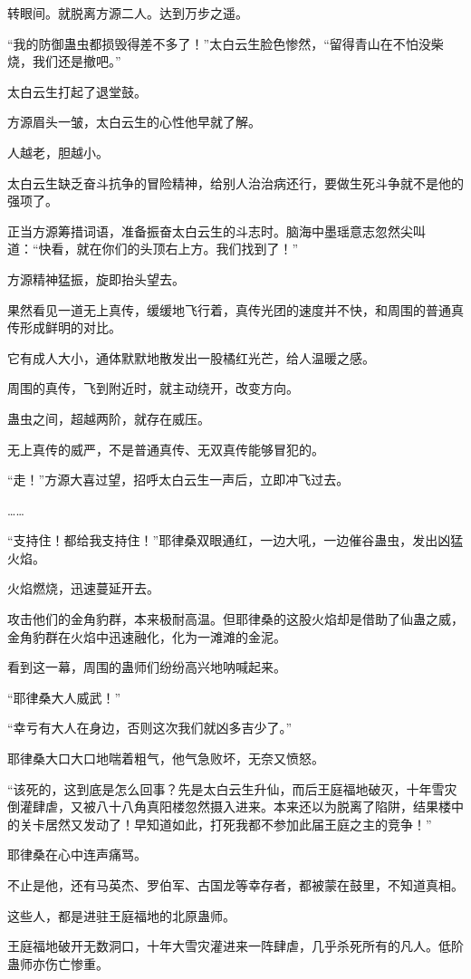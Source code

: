 \begin{this_body}
转眼间。就脱离方源二人。达到万步之遥。

“我的防御蛊虫都损毁得差不多了！”太白云生脸色惨然，“留得青山在不怕没柴烧，我们还是撤吧。”

太白云生打起了退堂鼓。

方源眉头一皱，太白云生的心性他早就了解。

人越老，胆越小。

太白云生缺乏奋斗抗争的冒险精神，给别人治治病还行，要做生死斗争就不是他的强项了。

正当方源筹措词语，准备振奋太白云生的斗志时。脑海中墨瑶意志忽然尖叫道：“快看，就在你们的头顶右上方。我们找到了！”

方源精神猛振，旋即抬头望去。

果然看见一道无上真传，缓缓地飞行着，真传光团的速度并不快，和周围的普通真传形成鲜明的对比。

它有成人大小，通体默默地散发出一股橘红光芒，给人温暖之感。

周围的真传，飞到附近时，就主动绕开，改变方向。

蛊虫之间，超越两阶，就存在威压。

无上真传的威严，不是普通真传、无双真传能够冒犯的。

“走！”方源大喜过望，招呼太白云生一声后，立即冲飞过去。

……

“支持住！都给我支持住！”耶律桑双眼通红，一边大吼，一边催谷蛊虫，发出凶猛火焰。

火焰燃烧，迅速蔓延开去。

攻击他们的金角豹群，本来极耐高温。但耶律桑的这股火焰却是借助了仙蛊之威，金角豹群在火焰中迅速融化，化为一滩滩的金泥。

看到这一幕，周围的蛊师们纷纷高兴地呐喊起来。

“耶律桑大人威武！”

“幸亏有大人在身边，否则这次我们就凶多吉少了。”

耶律桑大口大口地喘着粗气，他气急败坏，无奈又愤怒。

“该死的，这到底是怎么回事？先是太白云生升仙，而后王庭福地破灭，十年雪灾倒灌肆虐，又被八十八角真阳楼忽然摄入进来。本来还以为脱离了陷阱，结果楼中的关卡居然又发动了！早知道如此，打死我都不参加此届王庭之主的竞争！”

耶律桑在心中连声痛骂。

不止是他，还有马英杰、罗伯军、古国龙等幸存者，都被蒙在鼓里，不知道真相。

这些人，都是进驻王庭福地的北原蛊师。

王庭福地破开无数洞口，十年大雪灾灌进来一阵肆虐，几乎杀死所有的凡人。低阶蛊师亦伤亡惨重。


\end{this_body}
